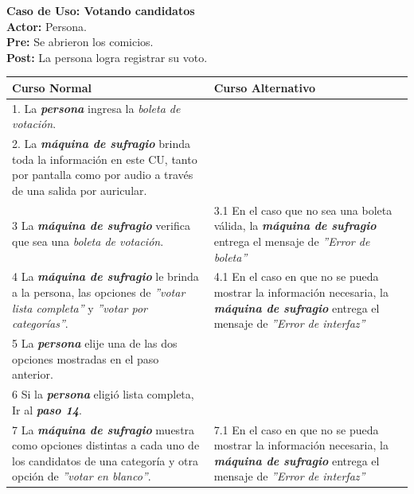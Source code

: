 \documentclass[spanish, 10pt,a4paper]{article}
\numberwithin{equation}{section} %
\begin{document}
\noindent\textbf{Caso de Uso: Votando candidatos}\\
\textbf{Actor: } Persona.\\
\textbf{Pre: } Se abrieron los comicios.\\
\textbf{Post: } La persona logra registrar su voto.\\
\begin{table}[H]
  \centering
\bgroup
\def\arraystretch{1.3}
  \begin{tabular}{p{9cm} | p{7cm}}
    \hline
    Curso Normal & Curso Alternativo \\
    \hline
    \hline    
    1. La \textbf{\textit{persona}} ingresa la \textit{boleta de votación}. 
    & \\
    
    \hline
    2. La \textbf{\textit{máquina de sufragio}} brinda toda la información en este CU, tanto por pantalla como por audio a través de una salida por auricular.
    &
    \\
    
    \hline
    3 La \textbf{\textit{máquina de sufragio}} verifica que sea una \textit{boleta de votación}.
    & 
    3.1 En el caso que no sea una boleta válida, la \textbf{\textit{máquina de sufragio}} entrega el mensaje de \textit{''Error de boleta''}
    \\
    
    \hline
    4 La \textbf{\textit{máquina de sufragio}} le brinda a la persona, las opciones de \textit{''votar lista completa''} y \textit{''votar por categorías''}.
    & 
    4.1 En el caso en que no se pueda mostrar la información necesaria, la \textbf{\textit{máquina de sufragio}} entrega el mensaje de \textit{''Error de interfaz''}
    \\
    
    \hline
    5 La \textbf{\textit{persona}} elije una de las dos opciones mostradas en el paso anterior.
    & \\
    
    \hline
    6 Si la \textbf{\textit{persona}} eligió lista completa, Ir al \textbf{\textit{paso 14}}.
    & \\
    
    \hline
    7 La \textbf{\textit{máquina de sufragio}} muestra como opciones distintas a cada uno de los candidatos de una categoría y otra opción de \textit{''votar en blanco''}.
    & 
    7.1 En el caso en que no se pueda mostrar la información necesaria, la \textbf{\textit{máquina de sufragio}} entrega el mensaje de \textit{''Error de interfaz''}
    \\
    

\end{tabular}
\end{table}
\end{document}
